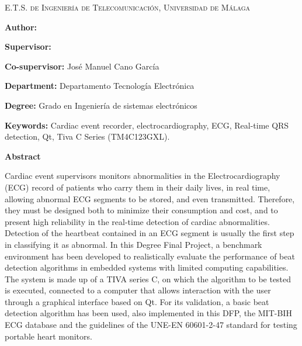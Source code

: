 
\pagestyle{fancy}

\begin{center}
	\scshape
	E.T.S. de Ingeniería de Telecomunicación, Universidad de Málaga
\end{center}

\bigskip

\begin{center}
	\Large \scshape
	\textbf{\tfgtitlenameENG}
\end{center}

\bigskip \bigskip \bigskip

\begin{minipage}{\textwidth}

\textbf{Author:} \tfgauthorname

\medskip

\textbf{Supervisor:} \tfgtutorname

\medskip

\textbf{Co-supervisor:} José Manuel Cano García

\medskip

\textbf{Department:} Departamento Tecnología Electrónica

\medskip

\textbf{Degree:} Grado en Ingeniería de sistemas electrónicos

\medskip

\textbf{Keywords:} Cardiac event recorder, electrocardiography, ECG, Real-time QRS detection, Qt, Tiva C Series (TM4C123GXL).

\bigskip \bigskip


\end{minipage}

\begin{center}
	\textbf{Abstract}
\end{center}

Cardiac event supervisors monitors abnormalities in the Electrocardiography (ECG) record of patients who carry them in their daily lives, in real time, allowing abnormal ECG segments to be stored, and even transmitted. Therefore, they must be designed both to minimize their consumption and cost, and to present high reliability in the real-time detection of cardiac abnormalities. Detection of the heartbeat contained in an ECG segment is usually the first step in classifying it as abnormal. In this Degree Final Project, a benchmark environment has been developed to realistically evaluate the performance of beat detection algorithms in embedded systems with limited computing capabilities. The system is made up of a TIVA series C, on which the algorithm to be tested is executed, connected to a computer that allows interaction with the user through a graphical interface based on Qt. For its validation, a basic beat detection algorithm has been used, also implemented in this DFP, the MIT-BIH ECG database and the guidelines of the UNE-EN 60601-2-47 standard for testing portable heart monitors.


\blankpage
